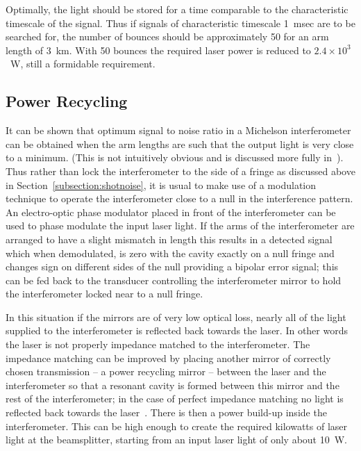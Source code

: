 \documentclass{article}
\begin{document}
Optimally, the light should be stored for a time comparable to the
characteristic timescale of the signal. Thus if signals of
characteristic timescale 1~msec are to be searched for, the number of
bounces should be approximately 50 for an arm length of 3~km. With 50
bounces the required laser power is reduced to $2.4 \times 10^3$~W,
still a formidable requirement.




\subsection{Power Recycling}
\label{subsection:powerrec}

It can be shown that optimum signal to noise ratio in a Michelson
interferometer can be obtained when the arm lengths are such that the
output light is very close to a minimum. (This is not intuitively
obvious and is discussed more fully in~\cite{Edelstein}). Thus rather
than lock the interferometer to the side of a fringe as discussed
above in Section~\ref{subsection:shotnoise}, it is usual to make use of a
modulation technique to operate the interferometer close to a null in
the interference pattern. An electro-optic phase modulator placed in
front of the interferometer can be used to phase modulate the input
laser light. If the arms of the interferometer are arranged to have a
slight mismatch in length this results in a detected signal which when
demodulated, is zero with the cavity exactly on a null fringe and
changes sign on different sides of the null providing a bipolar error
signal; this can be fed back to the transducer controlling the
interferometer mirror to hold the interferometer locked near to a null
fringe.

In this situation if the mirrors are of very low optical loss, nearly
all of the light supplied to the interferometer is reflected back
towards the laser. In other words the laser is not properly impedance
matched to the interferometer. The impedance matching can be improved
by placing another mirror of correctly chosen transmission -- a power
recycling mirror -- between the laser and the interferometer so that a
resonant cavity is formed between this mirror and the rest of the
interferometer; in the case of perfect impedance matching no light is
reflected back towards the laser~\cite{Drever3, Schilling}. There is
then a power build-up inside the interferometer. This can
be high enough to create the required kilowatts of laser light at the
beamsplitter, starting from an input laser light of only about 10~W.
\end{document}
